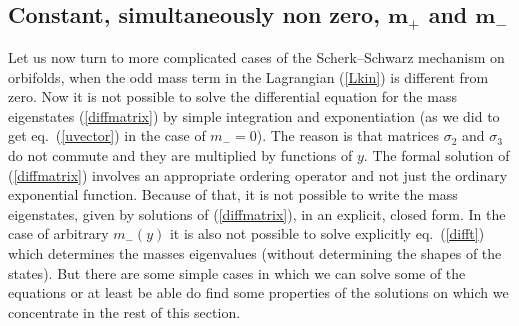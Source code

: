 \documentclass[a4paper,12pt]{article}
\def\si{\sigma}
\begin{document}
\subsection{Constant, simultaneously non zero, $\boldsymbol{m_+}$ and
$\boldsymbol{m_-}$} 


Let us now turn to more complicated cases of the Scherk--Schwarz
mechanism on orbifolds, when the odd mass term in the Lagrangian
(\ref{Lkin}) is different from zero. Now it is not possible to solve
the differential equation for the mass eigenstates (\ref{diffmatrix})
by simple integration and exponentiation (as we did to get eq.\
(\ref{uvector}) in the case of $m_-=0$). The reason is that matrices
$\si_2$ and $\si_3$ do not commute and they are multiplied by
functions of $y$. The formal solution of 
(\ref{diffmatrix}) involves an appropriate ordering operator and not
just the ordinary exponential function. Because of that, it is not
possible to write the mass eigenstates, given by solutions of
(\ref{diffmatrix}), in an explicit, closed form. In the case of
arbitrary $m_-(y)$ it is also not possible to solve explicitly eq.\
(\ref{difft}) which determines the masses eigenvalues (without
determining the shapes of the states). 
But there are some simple cases in which we can solve some
of the equations or at least be able do find some properties of the
solutions on which we concentrate in the rest of this section.
\end{document}
